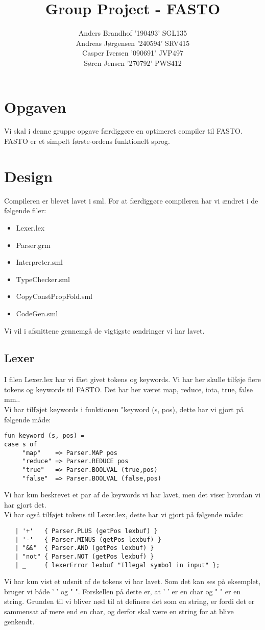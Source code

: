\documentclass[a4paper]{article}
\title{Group Project - FASTO}
\author{	Anders Brandhof '190493' SGL135 \\ Andreas Jørgensen '240594' SRV415 \\ Casper Iversen '090691' JVP497 \\ Søren Jensen '270792' PWS412 \\
}
\begin{document}
\maketitle
\newpage
\tableofcontents
\newpage

\section{Opgaven}
Vi skal i denne gruppe opgave færdiggøre en optimeret compiler til FASTO. FASTO er et simpelt første-ordens funktionelt sprog.
\section{Design}
Compileren er blevet lavet i sml. For at færdiggøre compileren har vi ændret i de følgende filer:
\begin{itemize}
\item Lexer.lex\\
\item Parser.grm \\
\item Interpreter.sml \\
\item TypeChecker.sml \\
\item CopyConstPropFold.sml \\
\item CodeGen.sml
\end{itemize} 
Vi vil i afsnittene gennemgå de vigtigste ændringer vi har lavet.
\subsection{Lexer}
I filen Lexer.lex har vi fået givet tokens og keywords. Vi har her skulle tilføje flere tokens og keywords til FASTO. Det har her været map, reduce, iota, true, false mm..\\
Vi har tilføjet keywords i funktionen "keyword (s, pos), dette har vi gjort på følgende måde: \\
\begin{lstlisting}
fun keyword (s, pos) =
case s of 
     "map"    => Parser.MAP pos
     "reduce" => Parser.REDUCE pos
     "true"   => Parser.BOOLVAL (true,pos)
     "false"  => Parser.BOOLVAL (false,pos)
\end{lstlisting}
Vi har kun beskrevet et par af de keywords vi har lavet, men det viser hvordan vi har gjort det.\\
Vi har også tilføjet tokens til Lexer.lex, dette har vi gjort på følgende måde:\\
\begin{lstlisting}
   | '+'   { Parser.PLUS (getPos lexbuf) }
   | '-'   { Parser.MINUS (getPos lexbuf) }
   | "&&"  { Parser.AND (getPos lexbuf) }
   | "not" { Parser.NOT (getPos lexbuf) }
   | _     { lexerError lexbuf "Illegal symbol in input" };
\end{lstlisting}
Vi har kun vist et udsnit af de tokens vi har lavet. Som det kan ses på eksemplet, bruger vi både ' ' og " ". Forskellen på dette er, at ' ' er en char og " " er en string. Grunden til vi bliver nød til at definere det som en string, er fordi det er sammensat af mere end en char, og derfor skal være en string for at blive genkendt.
\end{document}
